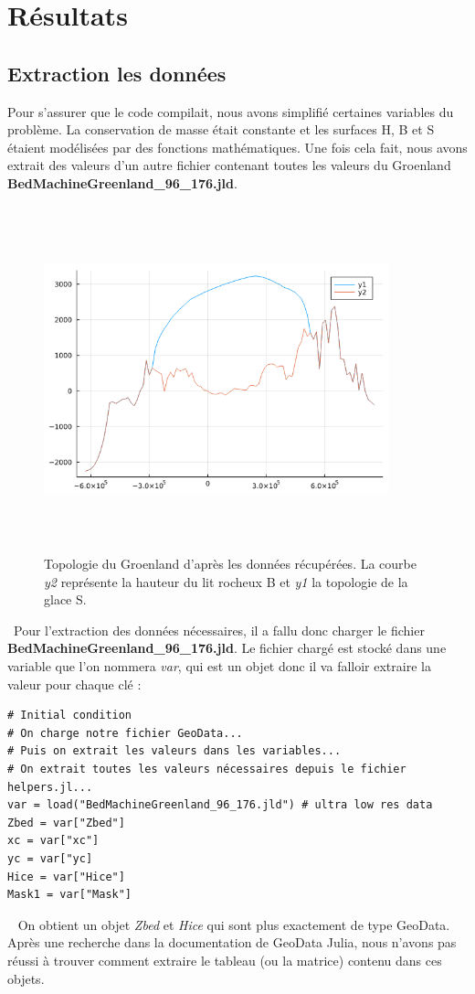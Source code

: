 \documentclass{article}
\begin{document}
\section{Résultats}

\subsection{Extraction les données}

Pour s'assurer que le code compilait, nous avons simplifié certaines variables du problème. La conservation de masse était constante et les surfaces H, B et S  étaient modélisées par des fonctions mathématiques. Une fois cela fait, nous avons extrait des valeurs d'un autre fichier contenant toutes les valeurs du Groenland \textbf{BedMachineGreenland\_96\_176.jld}.
\begin{figure}[!htpb]
\centering
\includegraphics[width=10cm, keepaspectratio=true, height=10cm]{Groenland.png}
\caption{Topologie du Groenland d'après les données récupérées. La courbe \textit{y2} représente la hauteur du lit rocheux B et \textit{y1} la topologie de la glace S. }
\end{figure}

\
Pour l’extraction des données nécessaires, il a fallu donc charger le ﬁchier \textbf{BedMachineGreenland\_96\_176.jld}.
Le ﬁchier chargé est stocké dans une variable que l’on nommera \textit{var}, qui est un objet donc il va falloir extraire la valeur pour chaque clé : 

\begin{verbatim}
# Initial condition
# On charge notre fichier GeoData...
# Puis on extrait les valeurs dans les variables...
# On extrait toutes les valeurs nécessaires depuis le fichier helpers.jl...
var = load("BedMachineGreenland_96_176.jld") # ultra low res data 
Zbed = var["Zbed"]
xc = var["xc"]
yc = var["yc]
Hice = var["Hice"]
Mask1 = var["Mask"]
\end{verbatim}
\
\newpage
On obtient un objet \textit{Zbed} et \textit{Hice} qui sont plus exactement de type GeoData. Après une recherche dans la documentation de GeoData Julia, nous n’avons pas réussi à trouver comment extraire le tableau (ou la matrice) contenu dans ces objets.
\end{document}
